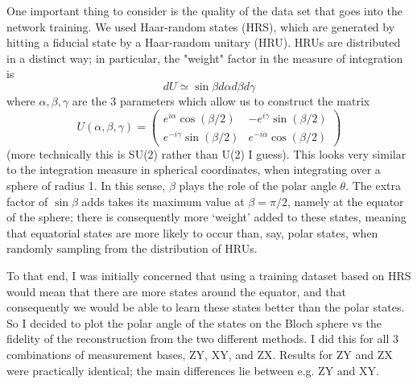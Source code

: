 \documentclass[a4paper,10pt]{article}
\begin{document}
One important thing to consider is the quality of the data set that goes into the network training. We used Haar-random states (HRS), which are generated by hitting a fiducial state by a Haar-random unitary (HRU). HRUs are distributed in a distinct way; in particular, the "weight" factor in the measure of integration is 
\begin{equation} 
 dU \simeq \sin \beta d\alpha d\beta d\gamma
\end{equation}
where $\alpha, \beta, \gamma$ are the 3 parameters which allow us to construct the matrix
\begin{equation}
 U(\alpha, \beta, \gamma) = \left( 
  \begin{array}{cc}
   e^{i \alpha} \cos( \beta/2) & -e^{i \gamma} \sin(\beta / 2) \\
    e^{-i \gamma} \sin(\beta / 2) & e^{-i \alpha} \cos( \beta/2) 
  \end{array}
  \right)
\end{equation}
 (more technically this is SU(2) rather than U(2) I guess). This looks very similar to the integration measure in spherical coordinates, when integrating over a sphere of radius 1. In this sense, $\beta$ plays the role of the polar angle $\theta$. The extra factor of $\sin \beta$ adds takes its maximum value at $\beta = \pi / 2$, namely at the equator of the sphere; there is consequently more `weight' added to these states, meaning that equatorial states are more likely to occur than, say, polar states, when randomly sampling from the distribution of HRUs.
 
 To that end, I was initially concerned that using a training dataset based on HRS would mean that there are more states around the equator, and that consequently we would be able to learn these states better than the polar states. So I decided to plot the polar angle of the states on the Bloch sphere vs the fidelity of the reconstruction from the two different methods. I did this for all 3 combinations of measurement bases, ZY, XY, and ZX. Results for ZY and ZX were practically identical; the main differences lie between e.g. ZY and XY.
 
\end{document}
